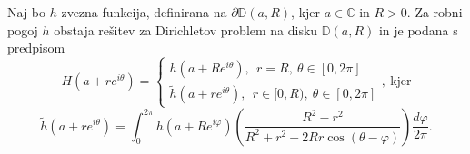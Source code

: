 \documentclass[mat1, tisk]{fmfdelo}
\begin{document}
    \begin{trditev}
        \label{alldisk}
        Naj bo $h$ zvezna funkcija, definirana na $\partial \mathbb{D}(a,R)$, kjer $a \in \mathbb{C}$ in $R>0$.  
        Za robni pogoj $h$ obstaja rešitev za Dirichletov problem na disku $\mathbb{D}(a,R)$ in je podana s predpisom
        $$
            H(a + r e^{i \theta}) = \begin{cases}
                    h(a + R e^{i \theta}),~~r = R,~\theta \in [0, 2\pi]\\
                    \widetilde{h}(a + r e^{i \theta}),~~ r \in [0,R),~ \theta \in [0, 2\pi]
            \end{cases},~\text{kjer}
        $$
        $$
        \widetilde{h}(a + r e^{i \theta}) = \int_{0}^{2 \pi}{h(a + R e^{i \varphi}) \left(\frac{R^2 - r^2}{R^2 + r^2 - 2Rr \cos(\theta - \varphi)}\right) \frac{d \varphi}{2 \pi}}.
        $$
     \end{trditev}
\end{document}
